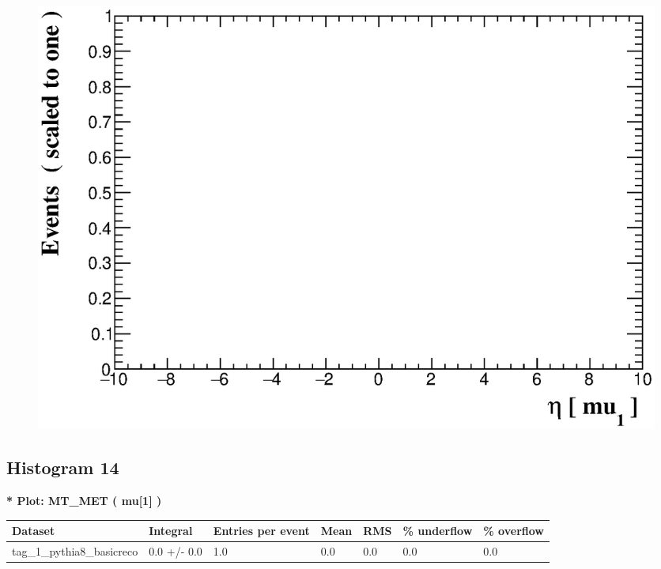 \documentclass[a4paper, 10pt]{article}
\begin{document}
\begin{figure}[H]
  \begin{center}
    \includegraphics[scale=0.45]{selection_12.eps}\\
\caption{   }
  \end{center}
\end{figure}
      \newpage
\subsection{ Histogram 14}

\textbf{* Plot: MT\_MET ( mu[1] ) }\\
   \begin{table}[H]
  \begin{center}
    \begin{tabular}{|m{23.0mm}|m{23.0mm}|m{18.0mm}|m{19.0mm}|m{19.0mm}|m{19.0mm}|m{19.0mm}|}
      \hline
      {\cellcolor{yellow}         Dataset}& {\cellcolor{yellow}         Integral}& {\cellcolor{yellow}         Entries per event}& {\cellcolor{yellow}         Mean}& {\cellcolor{yellow}         RMS}& {\cellcolor{yellow}         \% underflow}& {\cellcolor{yellow}         \% overflow}\\
      \hline
      {\cellcolor{white}         tag\_1\_pythia8\_basicreco}& {\cellcolor{white}         0.0 +/\-- 0.0}& {\cellcolor{white}         1.0}& {\cellcolor{white}         0.0}& {\cellcolor{white}         0.0}& {\cellcolor{green}         0.0}& {\cellcolor{green}         0.0}\\
\hline
    \end{tabular}
  \end{center}
\end{table}
\end{document}
